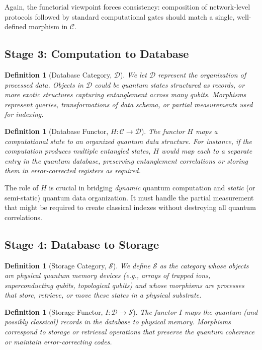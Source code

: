 \documentclass[12pt]{article}
\newtheorem{definition}[theorem]{Definition}
\begin{document}
Again, the functorial viewpoint forces consistency: composition of network-level protocols followed by standard computational gates should match a single, well-defined morphism in $\mathcal{C}$.

\subsection{Stage 3: Computation to Database}

\begin{definition}[Database Category, $\mathcal{D}$]
We let $\mathcal{D}$ represent the organization of processed data. Objects in $\mathcal{D}$ could be quantum states structured as records, or more exotic structures capturing entanglement across many qubits. Morphisms represent queries, transformations of data schema, or partial measurements used for indexing.
\end{definition}

\begin{definition}[Database Functor, $H: \mathcal{C} \to \mathcal{D}$]
The functor $H$ maps a computational state to an organized quantum data structure. For instance, if the computation produces multiple entangled states, $H$ would map each to a separate \emph{entry} in the quantum database, preserving entanglement correlations or storing them in error-corrected registers as required.
\end{definition}

The role of $H$ is crucial in bridging \emph{dynamic} quantum computation and \emph{static} (or semi-static) quantum data organization. It must handle the partial measurement that might be required to create classical indexes without destroying all quantum correlations.

\subsection{Stage 4: Database to Storage}

\begin{definition}[Storage Category, $\mathcal{S}$]
We define $\mathcal{S}$ as the category whose objects are physical quantum memory devices (e.g., arrays of trapped ions, superconducting qubits, topological qubits) and whose morphisms are processes that store, retrieve, or move these states in a physical substrate.
\end{definition}

\begin{definition}[Storage Functor, $I: \mathcal{D} \to \mathcal{S}$]
The functor $I$ maps the quantum (and possibly classical) records in the database to physical memory. Morphisms correspond to storage or retrieval operations that preserve the quantum coherence or maintain error-correcting codes.
\end{definition}
\end{document}
